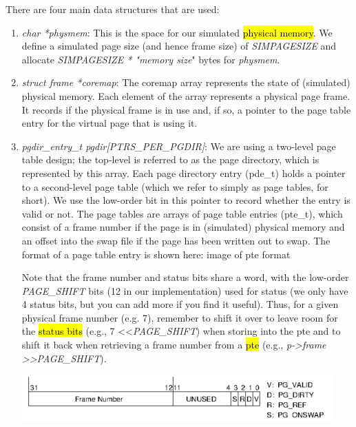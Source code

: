 \documentclass[12pt]{article}
\begin{document}
\bigskip

There are four main data structures that are used:

\bigskip

\begin{enumerate}[1.]
    \item \textit{char *physmem}: This is the space for our simulated \hl{physical memory}.
    We define a simulated page size (and hence frame size) of \textit{SIMPAGESIZE} and
    allocate \textit{SIMPAGESIZE * "memory size}" bytes for \textit{physmem}.
    \item \textit{struct frame *coremap}: The coremap array represents the state
    of (simulated) physical memory. Each element of the array represents a physical
    page frame. It records if the physical frame is in use and, if so, a pointer
    to the page table entry for the virtual page that is using it.
    \item \textit{pgdir\_entry\_t pgdir[PTRS\_PER\_PGDIR]}: We are using a two-level page table design; the top-level is referred to as the page directory, which is represented by this array. Each page directory entry (pde\_t) holds a pointer to a second-level page table (which we refer to simply as page tables, for short). We use the low-order bit in this pointer to record whether the entry is valid or not. The page tables are arrays of page table entries (pte\_t), which consist of a frame number if the page is in (simulated) physical memory and an offset into the swap file if the page has been written out to swap. The format of a page table entry is shown here: image of pte format

    \bigskip

    Note that the frame number and status bits share a word, with the low-order
    \textit{PAGE\_SHIFT} bits (12 in our implementation) used for status (we only
    have 4 status bits, but you can add more if you find it useful). Thus, for a
    given physical frame number (e.g. 7), remember to shift it over to leave room
    for the \hl{status bits} (e.g., 7 \textless \textless \textit{PAGE\_SHIFT}) when storing into
    the pte and to shift it back when retrieving a frame number from a \hl{pte}
    (e.g., \textit{p-\textgreater frame \textgreater \textgreater PAGE\_SHIFT}).

    \begin{center}
    \includegraphics[width=0.8\linewidth]{../images/assignment_2_1.png}
    \end{center}



\end{enumerate}
\end{document}
